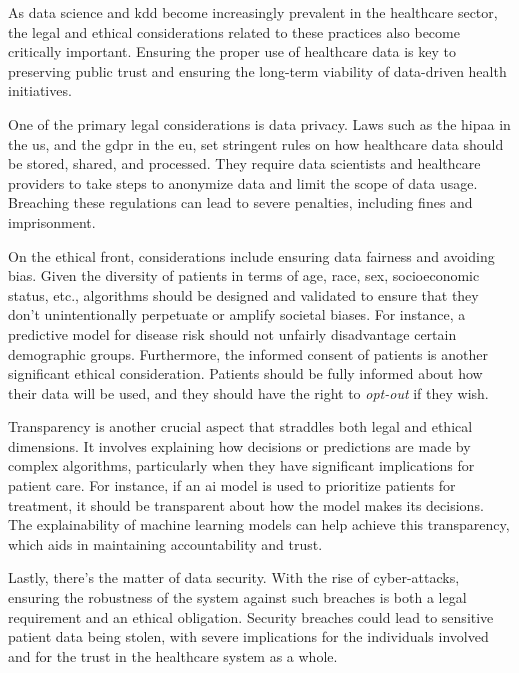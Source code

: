 
As data science and \ac{kdd} become increasingly prevalent in the healthcare sector, the legal and ethical considerations related to these practices also become critically important. Ensuring the proper use of healthcare data is key to preserving public trust and ensuring the long-term viability of data-driven health initiatives.

One of the primary legal considerations is data privacy. Laws such as the \ac{hipaa} in the \ac{us}, and the \ac{gdpr} in the \ac{eu}, set stringent rules on how healthcare data should be stored, shared, and processed. They require data scientists and healthcare providers to take steps to anonymize data and limit the scope of data usage. Breaching these regulations can lead to severe penalties, including fines and imprisonment.

On the ethical front, considerations include ensuring data fairness and avoiding bias. Given the diversity of patients in terms of age, race, sex, socioeconomic status, etc., algorithms should be designed and validated to ensure that they don't unintentionally perpetuate or amplify societal biases. For instance, a predictive model for disease risk should not unfairly disadvantage certain demographic groups. Furthermore, the informed consent of patients is another significant ethical consideration. Patients should be fully informed about how their data will be used, and they should have the right to \textit{opt-out} if they wish.

Transparency is another crucial aspect that straddles both legal and ethical dimensions. It involves explaining how decisions or predictions are made by complex algorithms, particularly when they have significant implications for patient care. For instance, if an \ac{ai} model is used to prioritize patients for treatment, it should be transparent about how the model makes its decisions. The explainability of machine learning models can help achieve this transparency, which aids in maintaining accountability and trust.

Lastly, there's the matter of data security. With the rise of cyber-attacks, ensuring the robustness of the system against such breaches is both a legal requirement and an ethical obligation. Security breaches could lead to sensitive patient data being stolen, with severe implications for the individuals involved and for the trust in the healthcare system as a whole.


